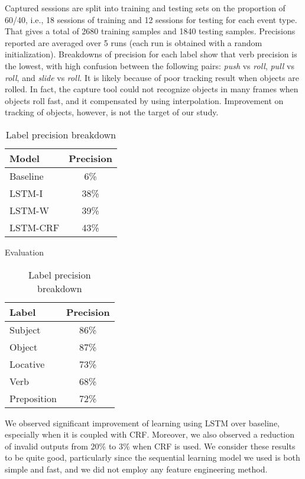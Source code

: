 \documentclass{esann}
\begin{document}
Captured sessions are split into training and testing sets on the proportion of 60/40, i.e., 18 sessions of training and 12 sessions for testing for each event type. That gives a total of 2680 training samples and 1840 testing samples. Precisions reported are averaged over 5 runs (each run is obtained with a random initialization). Breakdowns of precision for each label show that verb precision is the lowest, with high confusion between the following pairs: \textit{push} vs \textit{roll}, \textit{pull} vs \textit{roll}, and \textit{slide} vs \textit{roll}. It is likely because of poor tracking result when objects are rolled. In fact, the capture tool could not recognize objects in many frames when objects roll fast, and it compensated by using interpolation. Improvement on tracking of objects, however, is not the target of our study.

\begin{table}[!ht]
\parbox{.45\linewidth}{
\scriptsize
\label{table:headings}
\centering
\begin{tabular}{|l|c|}
\hline
Model & Precision \\
\hline
Baseline & 6\% \\
\hline
LSTM-I & 38\% \\
\hline
LSTM-W & 39\% \\
\hline
LSTM-CRF & 43\% \\
\hline
\end{tabular}
\vspace{3mm}
\caption{Evaluation}
}
\hfill
\parbox{.45\linewidth}{
\scriptsize
\label{table:headings}
\centering
\begin{tabular}{|l|c|}
\hline
Label & Precision \\
\hline
Subject & 86\% \\
\hline
Object & 87\% \\
\hline
Locative & 73\% \\
\hline
Verb & 68\% \\
\hline
Preposition & 72\% \\
\hline
\end{tabular}
\caption{Label precision breakdown}
}
\end{table}

\noindent We observed significant improvement of learning using LSTM over baseline, especially when it is coupled with CRF. Moreover, we also observed a reduction of invalid outputs from 20\% to 3\% when CRF is used.  We consider these  results to be quite good, particularly since the sequential learning model we used is both simple and fast, and we did not employ any feature engineering method.
\end{document}
